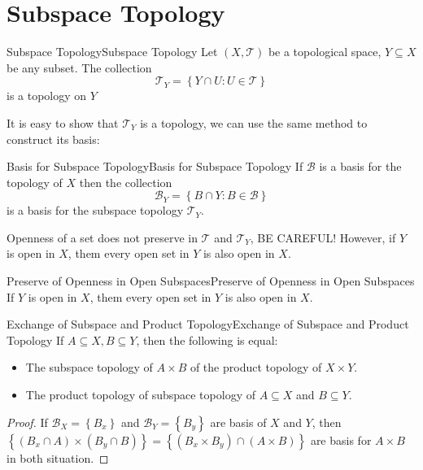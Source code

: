 \documentclass[../main.tex]{subfiles}
\begin{document}
\section{Subspace Topology}

\begin{definition}{Subspace Topology}{Subspace Topology}
Let $(X,\mathcal{T})$ be a topological space, $Y \subseteq X$ be any subset. The collection
\begin{equation*}
\mathcal{T}_Y = \left\{ Y \cap U : U\in \mathcal{T} \right\}
\end{equation*}
is a topology on $Y$
\end{definition}

It is easy to show that $\mathcal{T}_Y$ is a topology, we can use the same method to construct its basis:
\begin{lemma}{Basis for Subspace Topology}{Basis for Subspace Topology}
If $\mathcal{B}$ is a basis for the topology of $X$ then the collection
\begin{equation*}
\mathcal{B}_Y = \left\{ B\cap Y: B\in \mathcal{B} \right\}
\end{equation*}
is a basis for the subspace topology $\mathcal{T}_Y$.
\end{lemma}

\begin{remark}
Openness of a set does not preserve in $\mathcal{T}$ and $\mathcal{T}_Y$, BE CAREFUL! However, if $Y$ is open in $X$, them every open set in $Y$ is also open in $X$.
\end{remark}

\begin{lemma}{Preserve of Openness in Open Subspaces}{Preserve of Openness in Open Subspaces}
If $Y$ is open in $X$, them every open set in $Y$ is also open in $X$.
\end{lemma}

\begin{theorem}{Exchange of Subspace and Product Topology}{Exchange of Subspace and Product Topology}
If $A \subseteq X, B \subseteq Y$, then the following is equal:
\begin{itemize}
\item The subspace topology of $A \times B$ of the product topology of $ X \times Y$.
\item The product topology of subspace topology of $A \subseteq X$ and $B \subseteq Y$.
\end{itemize}
\end{theorem}
\begin{proof}
	If $\mathcal{B}_X = \left\{ B_x \right\}$ and $\mathcal{B}_Y=\left\{ B_y \right\}$ are basis of $X$ and $Y$, then $\left\{ (B_x\cap A) \times (B_y \cap B) \right\} = \left\{ (B_x \times  B_y) \cap (A \times B) \right\}$ are basis for $A \times B$ in both situation.
\end{proof}
\end{document}
